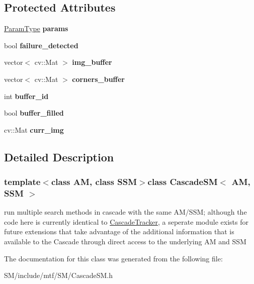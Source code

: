 \subsection*{Protected Attributes}
\begin{DoxyCompactItemize}
\item 
\hypertarget{classCascadeSM_aa890250e26b0f2f63e374c4a1ca95633}{\hyperlink{structCascadeParams}{Param\-Type} {\bfseries params}}\label{classCascadeSM_aa890250e26b0f2f63e374c4a1ca95633}

\item 
\hypertarget{classCascadeSM_a968678d70af6c50ec1d5e6a975ad1b28}{bool {\bfseries failure\-\_\-detected}}\label{classCascadeSM_a968678d70af6c50ec1d5e6a975ad1b28}

\item 
\hypertarget{classCascadeSM_a171d626bc3fddb4d52858f1faa4eb10d}{vector$<$ cv\-::\-Mat $>$ {\bfseries img\-\_\-buffer}}\label{classCascadeSM_a171d626bc3fddb4d52858f1faa4eb10d}

\item 
\hypertarget{classCascadeSM_a28020796ab72ee542176e46d11d9b8ba}{vector$<$ cv\-::\-Mat $>$ {\bfseries corners\-\_\-buffer}}\label{classCascadeSM_a28020796ab72ee542176e46d11d9b8ba}

\item 
\hypertarget{classCascadeSM_a5718343c4985f1fc99cc8e042b3f4fd3}{int {\bfseries buffer\-\_\-id}}\label{classCascadeSM_a5718343c4985f1fc99cc8e042b3f4fd3}

\item 
\hypertarget{classCascadeSM_ae9f9bb3f7a8f1866f7d94d78b0606705}{bool {\bfseries buffer\-\_\-filled}}\label{classCascadeSM_ae9f9bb3f7a8f1866f7d94d78b0606705}

\item 
\hypertarget{classCascadeSM_a6193fd7ff22c2c4dfcf0522ac5921bce}{cv\-::\-Mat {\bfseries curr\-\_\-img}}\label{classCascadeSM_a6193fd7ff22c2c4dfcf0522ac5921bce}

\end{DoxyCompactItemize}


\subsection{Detailed Description}
\subsubsection*{template$<$class A\-M, class S\-S\-M$>$class Cascade\-S\-M$<$ A\-M, S\-S\-M $>$}

run multiple search methods in cascade with the same A\-M/\-S\-S\-M; although the code here is currently identical to \hyperlink{classCascadeTracker}{Cascade\-Tracker}, a seperate module exists for future extensions that take advantage of the additional information that is available to the Cascade through direct access to the underlying A\-M and S\-S\-M 

The documentation for this class was generated from the following file\-:\begin{DoxyCompactItemize}
\item 
S\-M/include/mtf/\-S\-M/Cascade\-S\-M.\-h\end{DoxyCompactItemize}
